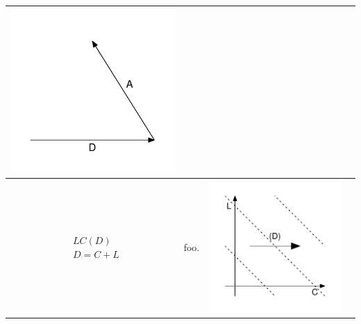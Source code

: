 \documentclass[
  12pt
]{scrartcl}
\begin{document}
\begin{center}
\begin{longtable}{m{}m{}m{}m{}}
  \includegraphics[width = \linewidth]{../fig/AD_iso.pdf}  \\
  \midrule
  $$\begin{aligned}
    &LC(D) \\
    &D = C + L
  \end{aligned}$$ &
  foo. &
  \includegraphics[width = \linewidth]{../fig/LCd.pdf} &

\end{longtable}
\end{center}
\end{document}
